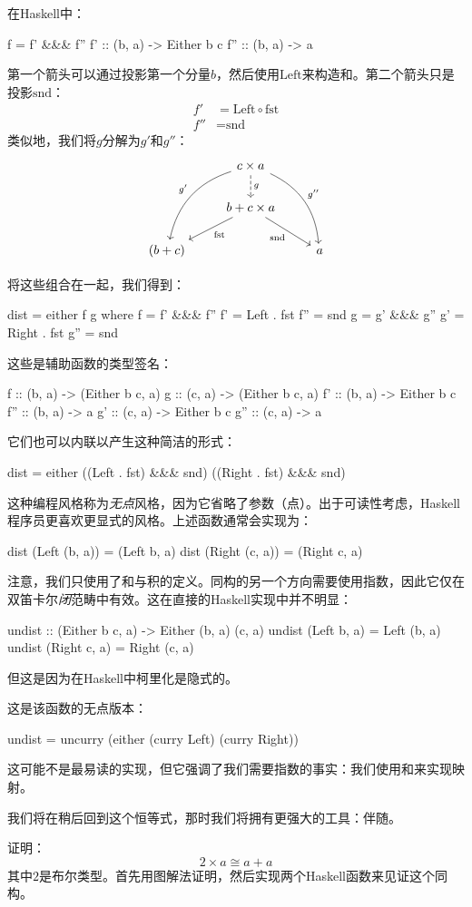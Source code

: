 \documentclass[DaoFP]{subfiles}
\begin{document}
在Haskell中：
\begin{haskell}
    f = f' &&& f''
    f'  :: (b, a) -> Either b c
    f'' :: (b, a) -> a
\end{haskell}
第一个箭头可以通过投影第一个分量$b$，然后使用$\text{Left}$来构造和。第二个箭头只是投影$\text{snd}$：
\begin{align*}
 f' &= \text{Left} \circ \text{fst} \\
 f'' &= \text{snd}
\end{align*}
类似地，我们将$g$分解为$g'$和$g''$：
\[
 \begin{tikzcd}
 & c \times a
\arrow[d, dashed, "g"]
 \arrow[ddl, bend right, "g'"']
 \arrow[ddr, bend left, "g''"]
\\
& b + c \times a
 \arrow[dl,  "\text{fst}"]
  \arrow[dr,   "\text{snd}"']
\\
(b + c) && a
 \end{tikzcd}
\]

将这些组合在一起，我们得到：
\begin{haskell}
dist = either f g
  where
    f   = f' &&& f''
    f'  = Left . fst
    f'' = snd
    g   = g' &&& g''
    g'  = Right . fst
    g'' = snd
\end{haskell}
这些是辅助函数的类型签名：
\begin{haskell}
    f   :: (b, a) -> (Either b c, a)
    g   :: (c, a) -> (Either b c, a)
    f'  :: (b, a) -> Either b c
    f'' :: (b, a) -> a
    g'  :: (c, a) -> Either b c
    g'' :: (c, a) -> a
\end{haskell}
它们也可以内联以产生这种简洁的形式：
\begin{haskell}
dist = either ((Left . fst) &&& snd) ((Right . fst) &&& snd)
\end{haskell}

这种编程风格称为\emph{无点}风格，因为它省略了参数（点）。出于可读性考虑，Haskell程序员更喜欢更显式的风格。上述函数通常会实现为：
\begin{haskell}
dist (Left  (b, a)) = (Left  b, a)
dist (Right (c, a)) = (Right c, a)
\end{haskell}

注意，我们只使用了和与积的定义。同构的另一个方向需要使用指数，因此它仅在双笛卡尔\emph{闭}范畴中有效。这在直接的Haskell实现中并不明显：
\begin{haskell}
undist :: (Either b c, a) -> Either (b, a) (c, a)
undist (Left b, a)  = Left (b, a)
undist (Right c, a) = Right (c, a)
\end{haskell}
但这是因为在Haskell中柯里化是隐式的。

这是该函数的无点版本：
\begin{haskell}
undist = uncurry (either (curry Left) (curry Right))
\end{haskell}
这可能不是最易读的实现，但它强调了我们需要指数的事实：我们使用和来实现映射。

我们将在稍后回到这个恒等式，那时我们将拥有更强大的工具：伴随。

\begin{exercise}
证明：
\[ 2 \times a \cong a + a \]
其中$2$是布尔类型。首先用图解法证明，然后实现两个Haskell函数来见证这个同构。
\end{exercise}
\end{document}
